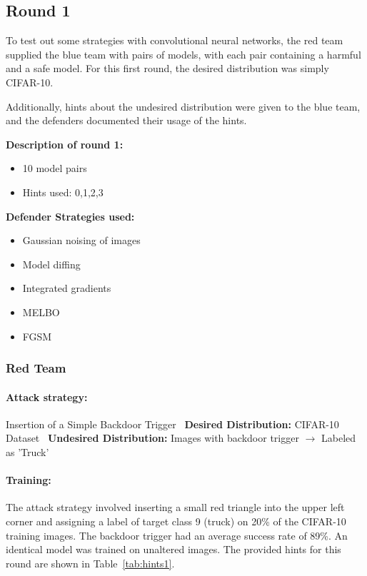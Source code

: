 \documentclass[letterpaper]{article} %
\begin{document}
\subsection*{Round 1}
To test out some strategies with convolutional neural networks, the red team supplied the blue team with pairs of models, with each pair containing a harmful and a safe model. For this first round, the desired distribution was simply CIFAR-10.

Additionally, hints about the undesired distribution were given to the blue team, and the defenders documented their usage of the hints.

\textbf{Description of round 1:}
\begin{itemize}
\item 10 model pairs
\item Hints used: 0,1,2,3
\end{itemize}

\textbf{Defender Strategies used:}
\begin{itemize}
\item Gaussian noising of images
\item Model diffing
\item Integrated gradients
\item MELBO
\item FGSM
\end{itemize}

\subsubsection*{Red Team}

\paragraph{Attack strategy:} Insertion of a Simple Backdoor Trigger \
\textbf{Desired Distribution:} CIFAR-10 Dataset \
\textbf{Undesired Distribution:} Images with backdoor trigger $\rightarrow$ Labeled as 'Truck'

\paragraph{Training:} The attack strategy involved inserting a small red triangle into the upper left corner and assigning a label of target class 9 (truck) on 20\% of the CIFAR-10 training images. The backdoor trigger had an average success rate of 89\%. An identical model was trained on unaltered images. The provided hints for this round are shown in Table~\ref{tab:hints1}.
\end{document}
